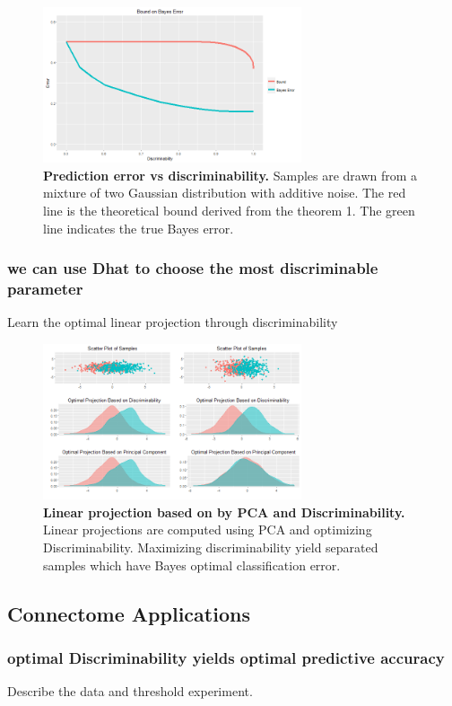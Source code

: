 \documentclass{article}
\begin{document}
\begin{figure}[ht!]
	\includegraphics[width=3.0in]{../Figs/theo_plot.png}
	\caption{{\bf Prediction error vs discriminability.} Samples are drawn from a mixture of two Gaussian distribution with additive noise. The red line is the theoretical bound derived from the theorem 1. The green line indicates the true Bayes error. }
	\label{fig:1}
\end{figure}


\subsubsection{we can use Dhat to choose the most discriminable parameter }
 Learn the optimal linear projection through discriminability

\begin{figure}[ht!]
	\includegraphics[width=3.0in]{../Figs/opt_proj.png}
	\caption{{\bf Linear projection based on by PCA and Discriminability.} Linear projections are computed using PCA and optimizing Discriminability. Maximizing discriminability yield separated samples which have Bayes optimal classification error. }
	\label{fig:3}
\end{figure}


\subsection{Connectome Applications}

\subsubsection{optimal Discriminability yields optimal predictive accuracy}
 Describe the data and threshold experiment. 
\end{document}
